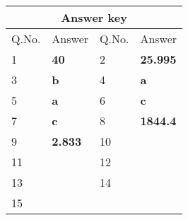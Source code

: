 \begin{table}[H]
	\centering
	\begin{tabular}{|p{1.5cm}|p{1.5cm}||p{1.5cm}|p{1.5cm}|}
		\hline
		\multicolumn{4}{|c|}{\textbf{Answer key}}\\\hline\hline
		\rowcolor{ocrel}Q.No.&Answer&Q.No.&Answer\\\hline
		1&\textbf{40} &2&\textbf{25.995}\\\hline 
		3&\textbf{b} &4&\textbf{a} \\\hline
		5&\textbf{a} &6&\textbf{c} \\\hline
		7&\textbf{c}&8&\textbf{1844.4}\\\hline
		9&\textbf{2.833}&10&\textbf{}\\\hline
		11&\textbf{} &12&\textbf{}\\\hline
		13&\textbf{}&14&\textbf{}\\\hline
		15&\textbf{}& &\\\hline
	
	\end{tabular}
\end{table}

